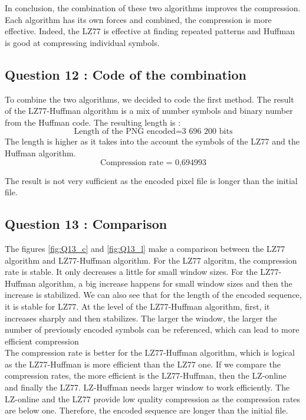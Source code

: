 \documentclass[titlepage]{article}
\begin{document}
In conclusion, the combination of these two algorithms improves the compression. Each algorithm has its own forces and combined, the compression is more effective. Indeed, the LZ77 is effective at finding repeated patterns and Huffman is good at compressing individual symbols. 


\subsection{Question 12 : Code of the combination}

To combine the two algorithms, we decided to code the first method. The result of the LZ77-Huffman algorithm is a mix of number symbols and binary number from the Huffman code. The resulting length is : 
$$\text{Length of the PNG encoded} = \text{3 696 200 bits}$$
The length is higher as it takes into the account the symbols of the LZ77 and the Huffman algorithm. 
$$\text{Compression rate = 0,694993}$$

The result is not very sufficient as the encoded pixel file is longer than the initial file. 

\subsection{Question 13 : Comparison }

The figures \ref{fig:Q13_c} and \ref{fig:Q13_l} make a comparison between the LZ77 algorithm and LZ77-Huffman algorithm. For the LZ77 algoritm, the compression rate is stable. It only decreases a little for small window sizes. For the LZ77-Huffman algorithm, a big increase happens for small window sizes and then the increase is stabilized. We can also see that for the length of the encoded sequence, it is stable for LZ77. At the level of the LZ77-Huffman algorithm, first, it increases sharply and then stabilizes. The larger the window, the larger the number of previously encoded symbols can be referenced, which can lead to more efficient compression\\

The compression rate is better for the LZ77-Huffman algorithm, which is logical as the LZ77-Huffman is more efficient than the LZ77 one. If we compare the compression rates, the more efficient is the LZ77-Huffman, then the LZ-online and finally the LZ77. LZ-Huffman needs larger window to work efficiently.  The LZ-online and the LZ77 provide low quality compression as the compression rates are below one. Therefore, the encoded sequence are longer than the initial file. 
\end{document}
